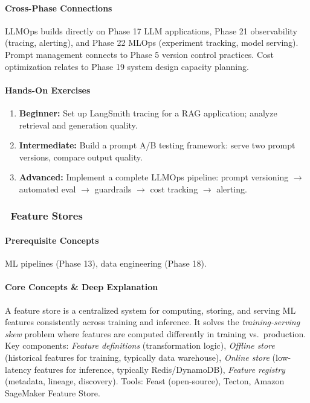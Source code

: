 \documentclass[11pt, a4paper, oneside]{report}
\newcommand{\awareness}[1]{\subsubsection{\texorpdfstring{\fcolorbox{gray!50}{gray!10}{\footnotesize\bfseries\color{gray!50!black} AWARENESS}~#1}{#1}}}
\newcommand{\arrow}{$\rightarrow$}
\begin{document}
\paragraph{Cross-Phase Connections} LLMOps builds directly on Phase 17 LLM applications, Phase 21 observability (tracing, alerting), and Phase 22 MLOps (experiment tracking, model serving). Prompt management connects to Phase 5 version control practices. Cost optimization relates to Phase 19 system design capacity planning.

\paragraph{Hands-On Exercises}
\begin{enumerate}[leftmargin=*]
\item \textbf{Beginner:} Set up LangSmith tracing for a RAG application; analyze retrieval and generation quality.
\item \textbf{Intermediate:} Build a prompt A/B testing framework: serve two prompt versions, compare output quality.
\item \textbf{Advanced:} Implement a complete LLMOps pipeline: prompt versioning \arrow{} automated eval \arrow{} guardrails \arrow{} cost tracking \arrow{} alerting.
\end{enumerate}


\awareness{Feature Stores}

\paragraph{Prerequisite Concepts} ML pipelines (Phase 13), data engineering (Phase 18).

\paragraph{Core Concepts \& Deep Explanation} A feature store is a centralized system for computing, storing, and serving ML features consistently across training and inference. It solves the \emph{training-serving skew} problem where features are computed differently in training vs.\ production. Key components: \emph{Feature definitions} (transformation logic), \emph{Offline store} (historical features for training, typically data warehouse), \emph{Online store} (low-latency features for inference, typically Redis/DynamoDB), \emph{Feature registry} (metadata, lineage, discovery). Tools: Feast (open-source), Tecton, Amazon SageMaker Feature Store.
\end{document}
